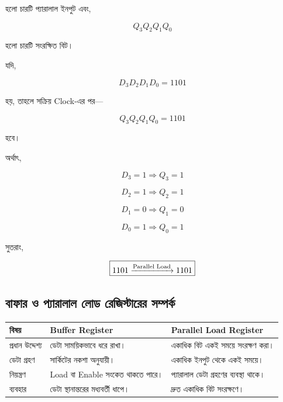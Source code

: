 হলো চারটি প্যারালাল ইনপুট এবং,

\[
Q_3Q_2Q_1Q_0
\]

হলো চারটি সংরক্ষিত বিট।

যদি,

\[
D_3D_2D_1D_0=1101
\]

হয়, তাহলে সক্রিয় \textenglish{Clock}-এর পর—

\[
Q_3Q_2Q_1Q_0=1101
\]

হবে।

অর্থাৎ,

\[
D_3=1\Rightarrow Q_3=1
\]

\[
D_2=1\Rightarrow Q_2=1
\]

\[
D_1=0\Rightarrow Q_1=0
\]

\[
D_0=1\Rightarrow Q_0=1
\]

সুতরাং,

\[
\boxed{
1101
\xrightarrow{\text{\textenglish{Parallel Load}}}
1101
}
\]



\subsection{বাফার ও প্যারালাল লোড রেজিস্টারের সম্পর্ক}

\begin{center}
\renewcommand{\arraystretch}{1.25}

\begin{tabularx}
{\textwidth}
{|L{0.21\textwidth}|Y|Y|}

\hline


\textbf{বিষয়}
&
\textbf{\textenglish{Buffer Register}}
&
\textbf{\textenglish{Parallel Load Register}}
\\
\hline

প্রধান উদ্দেশ্য
&
ডেটা সাময়িকভাবে ধরে রাখা।
&
একাধিক বিট একই সময়ে সংরক্ষণ করা।
\\
\hline

ডেটা গ্রহণ
&
সার্কিটের নকশা অনুযায়ী।
&
একাধিক ইনপুট থেকে একই সময়ে।
\\
\hline

নিয়ন্ত্রণ
&
\textenglish{Load} বা \textenglish{Enable} সংকেত থাকতে পারে।
&
প্যারালাল ডেটা গ্রহণের ব্যবস্থা থাকে।
\\
\hline

ব্যবহার
&
ডেটা স্থানান্তরের মধ্যবর্তী ধাপে।
&
দ্রুত একাধিক বিট সংরক্ষণে।
\\
\hline

\end{tabularx}
\end{center}

